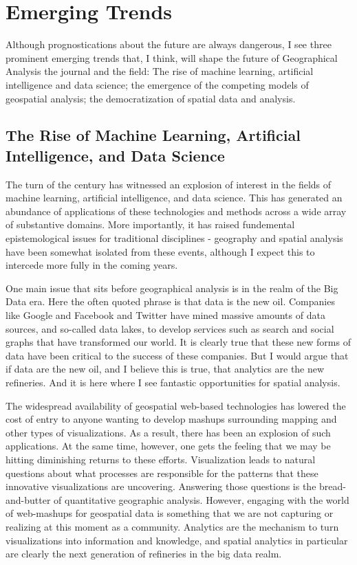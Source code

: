 \documentclass[11pt]{article}
\begin{document}
\section{Emerging Trends}
\label{sec:orga8cc385}

Although prognostications about the future are always dangerous, I see three
prominent emerging trends that, I think, will shape the future of Geographical
Analysis the journal and the field: The rise of machine learning, artificial
intelligence and data science; the emergence of the competing models of
geospatial analysis; the democratization of spatial data and analysis.



\subsection{The Rise of Machine Learning, Artificial Intelligence, and Data Science}
\label{sec:org2d89c2b}

The turn of the century has witnessed an explosion of interest in the fields of
machine learning, artificial intelligence, and data science. This has generated
an abundance of applications of these technologies and methods across a wide
array of substantive domains. More importantly, it has raised fundemental
epistemological issues for traditional disciplines - geography and spatial
analysis have been somewhat isolated from these events, although I expect this
to intercede more fully in the coming years.

One main issue that sits before geographical analysis is in the realm of
the Big Data era. Here the often quoted phrase is that data is the new oil.
Companies like Google and Facebook and Twitter have mined massive amounts of
data sources, and so-called data lakes, to develop services such as search and
social graphs that have transformed our world. It is clearly true that these
new forms of data have been critical to the success of these companies. But I
would argue that if data are the new oil, and I believe this is true, that
analytics are the new refineries. And it is here where I see fantastic
opportunities for spatial analysis.

The widespread availability of geospatial web-based technologies has lowered the
cost of entry to anyone wanting to develop mashups surrounding mapping and other
types of visualizations. As a result, there has been an explosion of such
applications. At the same time, however, one gets the feeling that we may be
hitting diminishing returns to these efforts. Visualization leads to natural
questions about what processes are responsible for the patterns that these
innovative visualizations are uncovering. Answering those questions is the
bread-and-butter of quantitative geographic analysis. However, engaging with the
world of web-mashups for geospatial data is something that we are not capturing
or realizing at this moment as a community. Analytics are the mechanism to turn
visualizations into information and knowledge, and spatial analytics in
particular are clearly the next generation of refineries in the big data realm.
\end{document}
